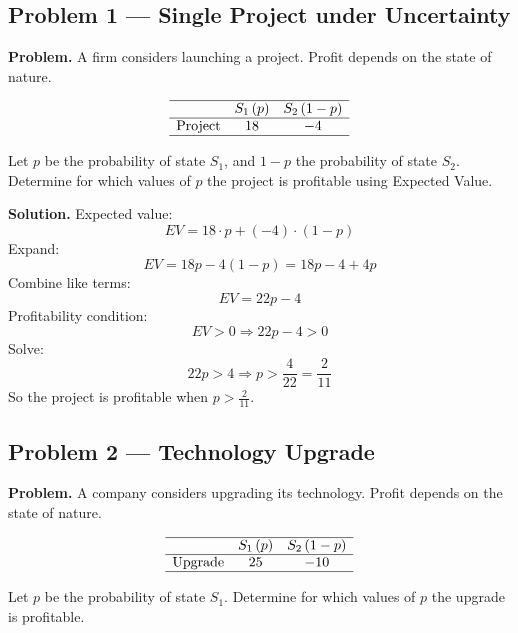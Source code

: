 	\begin{ExamProblems}
		
		\hypertarget{c7-ex1}{}
		\item
		\subsection*{Problem 1 — Single Project under Uncertainty}
		
		\textbf{Problem.}
		A firm considers launching a project. Profit depends on the state of nature.
		
		\[
		\begin{array}{lcc}
			\hline
			& S_1\,(p) & S_2\,(1-p) \\
			\hline
			\text{Project} & 18 & -4 \\
			\hline
		\end{array}
		\]
		
		Let \(p\) be the probability of state \(S_1\), and \(1-p\) the probability of state \(S_2\).  
		Determine for which values of \(p\) the project is profitable using Expected Value.
		
		\textbf{Solution.}
		Expected value:
		\[
		EV = 18\cdot p + (-4)\cdot(1-p)
		\]
		Expand:
		\[
		EV = 18p - 4(1-p) = 18p - 4 + 4p
		\]
		Combine like terms:
		\[
		EV = 22p - 4
		\]
		Profitability condition:
		\[
		EV>0 \Rightarrow 22p-4>0
		\]
		Solve:
		\[
		22p>4 \Rightarrow p>\frac{4}{22}=\frac{2}{11}
		\]
		So the project is profitable when \(p>\frac{2}{11}\).
		
		
		\hypertarget{c7-ex2}{}
		\item
		\subsection*{Problem 2 — Technology Upgrade}
		
		\textbf{Problem.}
		A company considers upgrading its technology. Profit depends on the state of nature.
		
		\[
		\begin{array}{lcc}
			\hline
			& S_1\,(p) & S_2\,(1-p) \\
			\hline
			\text{Upgrade} & 25 & -10 \\
			\hline
		\end{array}
		\]
		
		Let \(p\) be the probability of state \(S_1\).  
		Determine for which values of \(p\) the upgrade is profitable.
		

\end{ExamProblems}
